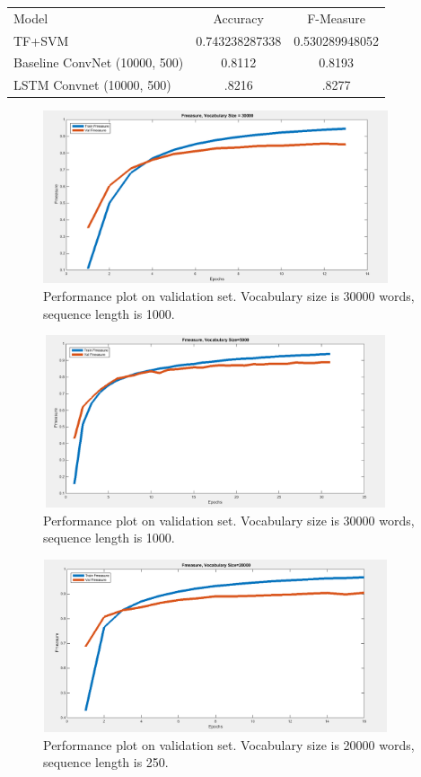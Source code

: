 \documentclass[12pt]{article}
\begin{document}
\begin{tabular}[pos]{l c c}
  Model & Accuracy & F-Measure\\
  TF+SVM &  0.743238287338 &  0.530289948052\\
  Baseline ConvNet (10000, 500) & 0.8112 & 0.8193\\
  LSTM Convnet (10000, 500)& .8216 & .8277\\
\end{tabular}

\begin{figure}[H]
\centering
\includegraphics[height=2in, width=4in]{Images/fmeasure_nsf_30000_1000.png}
\caption{Performance plot on validation set. Vocabulary size is 30000 words, sequence length is 1000.}
\end{figure}


\begin{figure}[H]
\centering
\includegraphics[height=2in, width=4in]{Images/fmeasure_nsf_5000_500.png}
\caption{Performance plot on validation set. Vocabulary size is 30000 words, sequence length is 1000.}
\end{figure}

\begin{figure}[H]
\centering
\includegraphics[height=2in, width=4in]{Images/fmeasure_nsf_20000_250.png}
\caption{Performance plot on validation set. Vocabulary size is 20000 words, sequence length is 250.}
\end{figure}
\end{document}
